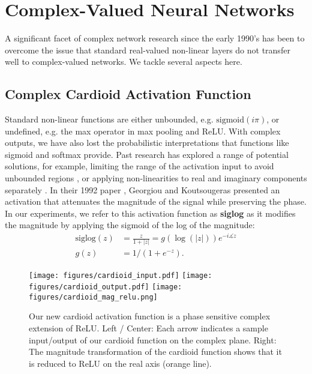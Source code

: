 \documentclass{article}
\renewcommand{\angle}{\measuredangle}
\begin{document}
\section{Complex-Valued Neural Networks}
\label{sec:theory}

A significant facet of complex network research since the early 1990's has been to overcome the issue that standard real-valued non-linear layers do not transfer well to complex-valued networks.  We tackle several aspects here.

\subsection{Complex Cardioid Activation Function}

 Standard non-linear functions are either unbounded, e.g. $\text{sigmoid}(i\pi)$, or undefined, e.g. the max operator in max pooling and ReLU.  With complex outputs, we have also lost the probabilistic interpretations that functions like sigmoid and softmax provide. Past research has explored a range of potential solutions, for example, limiting the range of the activation input to avoid unbounded regions \cite{complex_backprop_leung}, or applying non-linearities to real and imaginary components separately \cite{complex_backprop_nitta,single_layer_cvnn}. In their 1992 paper \cite{complex_backprop_georgiou}, Georgiou and Koutsougeras presented an activation that attenuates the magnitude of the signal while preserving the phase. In our experiments, we refer to this activation function as \textbf{siglog} as it modifies the magnitude by applying the sigmoid of the log of the magnitude:
\begin{align}
\text{siglog}(z) &= \frac{z}{1+|z|} = g(\log(|z|))e^{-i\angle z}\\
g(z) &= 1/(1+e^{-z}).
\end{align}

\begin{figure}[tp]
\centering
	\texttt{[image: figures/cardioid\_input.pdf]}
	\texttt{[image: figures/cardioid\_output.pdf]}
	\texttt{[image: figures/cardioid\_mag\_relu.png]}
	\label{fig:cardioid}
	\caption{Our new cardioid activation function is a phase sensitive complex extension of ReLU.  Left / Center: 
	Each arrow indicates a sample input/output of our cardioid function  on the complex plane. Right: The magnitude transformation of the cardioid function shows that it is reduced to ReLU on the real axis (orange line). }
\end{figure}
\end{document}
